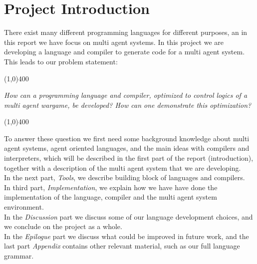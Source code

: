 \chapter{Project Introduction}

There exist many different programming languages for different purposes, an in this report we have focus on multi agent systems. In this project we are developing a language and compiler to generate code for a multi agent system. This leads to our problem statement:
\begin{center}
\line(1,0){400}
\end{center}
	\textit{How can a programming language and compiler, optimized to control logics of a multi agent wargame, be developed? How can one demonstrate this optimization?}
\begin{center}
\line(1,0){400}
\end{center}
To answer these question we first need some background knowledge about multi agent systems, agent oriented languages, and the main ideas with compilers and interpreters, which will be described in the first part of the report (introduction), together with a description of the multi agent system that we are developing.\\ \indent
In the next part, \textit{Tools}, we describe building block of languages and compilers.\\ \indent
In third part, \textit{Implementation}, we explain how we have have done the implementation of the language, compiler and the multi agent system environment.\\ \indent
In the \textit{Discussion} part we discuss some of our language development choices, and we conclude on the project as a whole.\\ \indent
In the \textit{Epilogue} part we discuss what could be improved in future work, and the last part \textit{Appendix} contains other relevant material, such as our full language grammar.